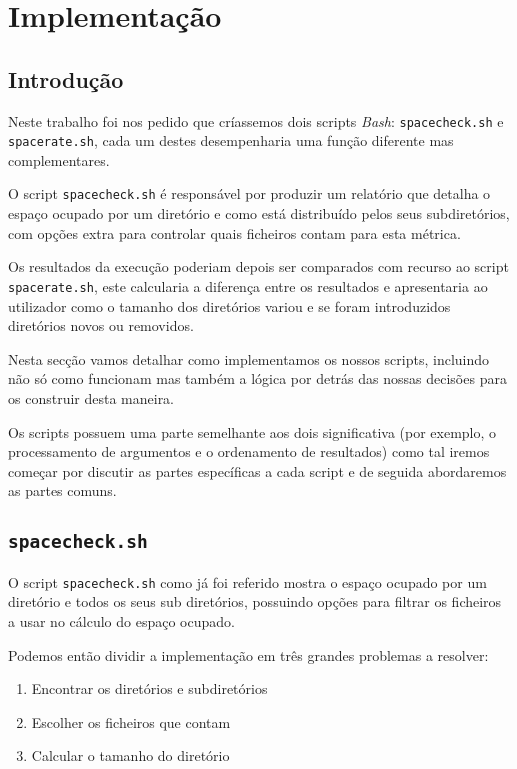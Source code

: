\chapter{Implementação}

\section{Introdução}

Neste trabalho foi nos pedido que críassemos dois scripts \emph{Bash}:
\Verb|spacecheck.sh| e \Verb|spacerate.sh|, cada um destes desempenharia uma
função diferente mas complementares.

O script \Verb|spacecheck.sh| é responsável por produzir um relatório que
detalha o espaço ocupado por um diretório e como está distribuído pelos seus
subdiretórios, com opções extra para controlar quais ficheiros contam para esta
métrica.

Os resultados da execução poderiam depois ser comparados com recurso ao script
\Verb|spacerate.sh|, este calcularia a diferença entre os resultados e
apresentaria ao utilizador como o tamanho dos diretórios variou e se foram
introduzidos diretórios novos ou removidos.

Nesta secção vamos detalhar como implementamos os nossos scripts, incluindo não
só como funcionam mas também a lógica por detrás das nossas decisões para os
construir desta maneira.

Os scripts possuem uma parte semelhante aos dois significativa (por exemplo, o
processamento de argumentos e o ordenamento de resultados) como tal iremos
começar por discutir as partes específicas a cada script e de seguida
abordaremos as partes comuns.

\cprotect\section{\Verb|spacecheck.sh|}

O script \Verb|spacecheck.sh| como já foi referido mostra o espaço ocupado por
um diretório e todos os seus sub diretórios, possuindo opções para filtrar os
ficheiros a usar no cálculo do espaço ocupado.

Podemos então dividir a implementação em três grandes problemas a resolver:

\begin{enumerate}
	\item Encontrar os diretórios e subdiretórios
	\item Escolher os ficheiros que contam
	\item Calcular o tamanho do diretório
\end{enumerate}

